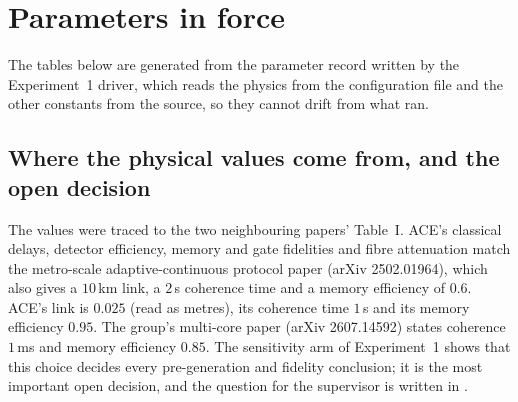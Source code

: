 \chapter{Parameters in force}
\label{app:params}

The tables below are generated from the parameter record written by the Experiment~1 driver, which reads the physics from the configuration file and the
other constants from the source, so they cannot drift from what ran.




\section{Where the physical values come from, and the open decision}
The values were traced to the two neighbouring papers' Table~I. ACE's classical delays, detector efficiency, memory and gate fidelities and fibre attenuation match
the metro-scale adaptive-continuous protocol paper (arXiv 2502.01964), which also gives a $10$\,km link, a $2$\,s coherence time and a memory efficiency of $0.6$.
ACE's link is $0.025$ (read as metres), its coherence time $1$\,s and its memory efficiency $0.95$. The group's multi-core paper (arXiv 2607.14592) states coherence $1$\,ms
and memory efficiency $0.85$. The sensitivity arm of Experiment~1 shows that this choice decides every pre-generation and fidelity conclusion; it is the most important open
decision, and the question for the supervisor is written in .
